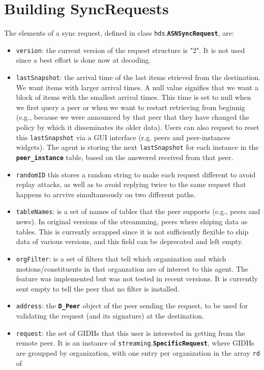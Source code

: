 \documentclass{book}
\newcommand{\pkg}[1]{{\tt #1}}
\newcommand{\cls}[1]{{\tt\bf #1}}
\newcommand{\mmb}[1]{{\tt #1}}
\begin{document}
\section{Building SyncRequests}
The elements of a sync request, defined in class \pkg{hds}.\cls{ASNSyncRequest}, are:
\begin{itemize}
\item
\mmb{version}: the current version of the request structure is "2". It is not used since a best effort is done now at decoding.
\item
\mmb{lastSnapshot}: the arrival time of the last items etrieved from the destination. We want items with larger arrival times.
A null value signifies that we want a block of items with the smallest arrival times. This time is set to null
when we first query a peer or when we want to restart retrieving from beginnig (e.g., because we were announced by that peer
that they have changed the policy by which it disseminates its older data). Users can also request to reset this 
\mmb{lastSnapshot} via a GUI interface (r.g. peers and peer-instances widgets). The agent is storing the next \mmb{lastSnapshot}
for each instance in the \cls{peer\_instance} table, based on the answered received from that peer.
\item
\mmb{randomID} this stores a random string to make each request different to avoid replay attacks, as well as to
avoid replying twice to the same request that happens to arrvive simultaneously on two different paths.
\item
\mmb{tableNames}: is a set of names of tables that the peer supports (e.g., peers and news). In original versions of the streamming, peers
where shiping data as tables. This is currently scrapped since it is not sufficiently flexible to ship data of various versions, and this field can be deprecated and left empty.
\item
\mmb{orgFilter}: is a set of filters that tell which organization and which motions/constituents in that organzation are of interest to
this agent. The feature was implemented but was not tested in recent versions. It is currently sent empty to tell the peer that no filter
is installed.
\item
\mmb{address}: the \cls{D\_Peer} object of the peer sending the request, to be used for validating the request (and its signature) at the destination.
\item
\mmb{request}: the set of GIDHs that this user is interested in getting from the remote peer. It is an instance of \pkg{streaming}.\cls{SpecificRequest}, where GIDHs are groupped by organization, with one entry per organization in the array \mmb{rd} of 

\end{itemize}
\end{document}
